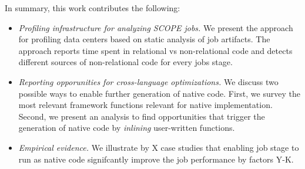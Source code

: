 In summary, this work contributes the following:
\begin{itemize}
\item \emph{Profiling infrastructure for analyzing SCOPE jobs.} 
We present the approach for profiling data centers based on static analysis of job artifacts. 
The approach reports time spent in relational vs non-relational code and detects different sources of non-relational code for every jobs stage. 

\item \emph{Reporting opporunities for cross-language optimizations.} We discuss two possible ways to enable further generation of native code. 
First, we survey the most relevant framework functions relevant for native implementation. 
Second, we present an analysis to find opportunities that trigger the generation of native code by \emph{inlining} user-written functions.  

\item \emph{Empirical evidence.} 
We illustrate by X case studies that enabling job stage to run as native code signifcantly improve the job performance by factors Y-K.
\end{itemize}


